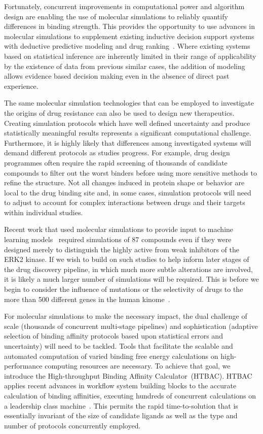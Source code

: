 \documentclass{bmcart}
\begin{document}
Fortunately, concurrent improvements in computational power and algorithm
design are enabling the use of molecular simulations to reliably quantify
differences in binding strength. This provides the opportunity to use
advances in molecular simulations to supplement existing inductive decision
support systems with deductive predictive modeling and drug
ranking~\cite{Marias2011, Sloot2009}. Where existing systems based on
statistical inference are inherently limited in their range of applicability
by the existence of data from previous similar cases, the addition of
modeling allows evidence based decision making even in the absence of direct
past experience.

The same molecular simulation technologies that can be employed to
investigate the origins of drug resistance can also be used to design new
therapeutics. Creating simulation protocols which have well defined
uncertainty and produce statistically meaningful results represents a
significant computational challenge. Furthermore, it is highly likely that
differences among investigated systems will demand different protocols as
studies progress. For example, drug design programmes often require the rapid
screening of thousands of candidate compounds to filter out the worst binders
before using more sensitive methods to refine the structure. Not all changes
induced in protein shape or behavior are local to the drug binding site and,
in some cases, simulation protocols will need to adjust to account for
complex interactions between drugs and their targets within individual
studies.

Recent work that used molecular simulations to provide input to machine
learning models~\cite{Ash2017} required simulations of 87 compounds even if
they were designed merely to distinguish the highly active from weak
inhibitors of the ERK2 kinase. If we wish to build on such studies to help
inform later stages of the drug discovery pipeline, in which much more subtle
alterations are involved, it is likely a much larger number of simulations
will be required. This is before we begin to consider the influence of
mutations or the selectivity of drugs to the more than 500 different genes in
the human kinome~\cite{Li2016}.

For molecular simulations to make the necessary impact, the dual challenge of
scale (thousands of concurrent multi-stage pipelines) and sophistication
(adaptive selection of binding affinity protocols based upon statistical
errors and uncertainty) will need to be tackled. Tools that facilitate the
scalable and automated computation of varied binding free energy calculations
on high-performance computing resources are necessary. To achieve that goal,
we introduce the High-throughput Binding Affinity Calculator~(HTBAC). HTBAC
applies recent advances in workflow system building blocks to the accurate
calculation of binding affinities, executing hundreds of concurrent
calculations on a leadership class machine~\cite{dakka}. This permits the rapid 
time-to-solution that is essentially invariant of the size of candidate ligands as
well as the type and number of protocols concurrently employed.
\end{document}
